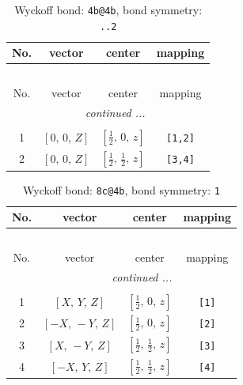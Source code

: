 \documentclass[fleqn,8pt]{jsarticle}
\begin{document}
\renewcommand{\arraystretch}{1.2}
\begin{longtable}{cccc}
\caption{Wyckoff bond: {\tt 4b@4b}, bond symmetry: {\tt ..2}}
 \\
 \hline \hline
No. & vector & center & mapping \\ \hline \endfirsthead

\multicolumn{3}{l}{\tablename\ \thetable{}} \\
 \hline \hline
No. & vector & center & mapping \\ \hline \endhead

 \hline \hline
\multicolumn{3}{r}{\footnotesize\it continued ...} \\ \endfoot

 \hline \hline
\multicolumn{3}{r}{} \\ \endlastfoot

1 & $\left[ 0,\, 0,\, Z \right]$ & $\left[ \frac{1}{2},\, 0,\, z \right]$ & {\tt [1,2]} \\ \hline
2 & $\left[ 0,\, 0,\, Z \right]$ & $\left[ \frac{1}{2},\, \frac{1}{2},\, z \right]$ & {\tt [3,4]} \\
\end{longtable}
\renewcommand{\arraystretch}{1.2}
\begin{longtable}{cccc}
\caption{Wyckoff bond: {\tt 8c@4b}, bond symmetry: {\tt 1}}
 \\
 \hline \hline
No. & vector & center & mapping \\ \hline \endfirsthead

\multicolumn{3}{l}{\tablename\ \thetable{}} \\
 \hline \hline
No. & vector & center & mapping \\ \hline \endhead

 \hline \hline
\multicolumn{3}{r}{\footnotesize\it continued ...} \\ \endfoot

 \hline \hline
\multicolumn{3}{r}{} \\ \endlastfoot

1 & $\left[ X,\, Y,\, Z \right]$ & $\left[ \frac{1}{2},\, 0,\, z \right]$ & {\tt [1]} \\ \hline
2 & $\left[ - X,\, - Y,\, Z \right]$ & $\left[ \frac{1}{2},\, 0,\, z \right]$ & {\tt [2]} \\ \hline
3 & $\left[ X,\, - Y,\, Z \right]$ & $\left[ \frac{1}{2},\, \frac{1}{2},\, z \right]$ & {\tt [3]} \\ \hline
4 & $\left[ - X,\, Y,\, Z \right]$ & $\left[ \frac{1}{2},\, \frac{1}{2},\, z \right]$ & {\tt [4]} \\
\end{longtable}
\end{document}
